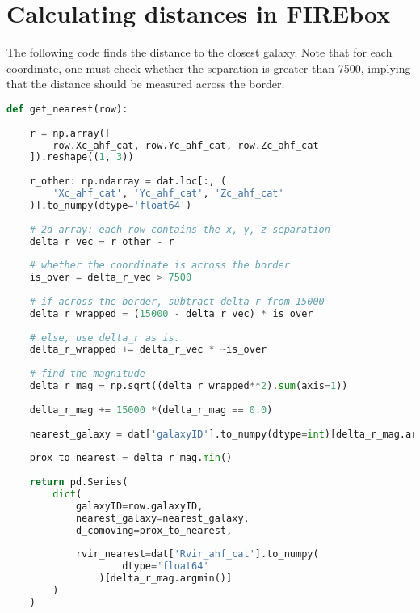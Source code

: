 
\chapter{Calculating distances in FIREbox}
\label{apx:distances}
The following code finds the distance to the closest galaxy. Note that for each coordinate, one must check whether the separation is greater than 7500, implying that the distance should be measured across the border.

\begin{lstlisting}[language=Python]
def get_nearest(row):
    
    r = np.array([
        row.Xc_ahf_cat, row.Yc_ahf_cat, row.Zc_ahf_cat
    ]).reshape((1, 3))
    
    r_other: np.ndarray = dat.loc[:, (
        'Xc_ahf_cat', 'Yc_ahf_cat', 'Zc_ahf_cat'
    )].to_numpy(dtype='float64')
    
    # 2d array: each row contains the x, y, z separation
    delta_r_vec = r_other - r
    
    # whether the coordinate is across the border
    is_over = delta_r_vec > 7500
    
    # if across the border, subtract delta_r from 15000
    delta_r_wrapped = (15000 - delta_r_vec) * is_over
    
    # else, use delta_r as is.
    delta_r_wrapped += delta_r_vec * ~is_over
    
    # find the magnitude
    delta_r_mag = np.sqrt((delta_r_wrapped**2).sum(axis=1))
    
    delta_r_mag += 15000 *(delta_r_mag == 0.0)
        
    nearest_galaxy = dat['galaxyID'].to_numpy(dtype=int)[delta_r_mag.argmin()]
    
    prox_to_nearest = delta_r_mag.min()
    
    return pd.Series(
        dict(
            galaxyID=row.galaxyID,
            nearest_galaxy=nearest_galaxy,
            d_comoving=prox_to_nearest,
            
            rvir_nearest=dat['Rvir_ahf_cat'].to_numpy(
                    dtype='float64'
                )[delta_r_mag.argmin()]
        )
    )

    
\end{lstlisting}